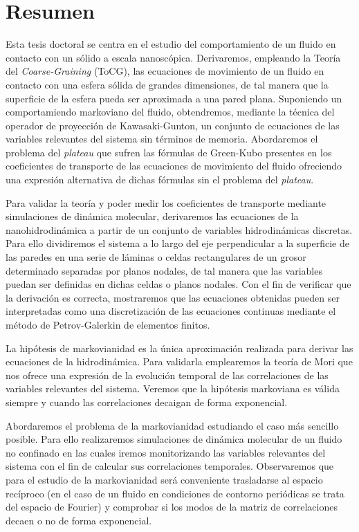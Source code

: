 \documentclass[b5paper,openright,10pt]{book}
\begin{document}
\chapter*{Resumen} %
Esta tesis doctoral se centra en el estudio del comportamiento de un fluido en contacto con un sólido a escala nanoscópica. 
Derivaremos, empleando la Teoría del \textit{Coarse-Graining} (ToCG), las ecuaciones de movimiento de un fluido en contacto con una esfera sólida de grandes dimensiones, de tal manera que la superficie de la esfera pueda ser aproximada a una pared plana. 
Suponiendo un comportamiendo markoviano del fluido, obtendremos, mediante la técnica del operador de proyección de Kawasaki-Gunton, un conjunto de ecuaciones de las variables relevantes del sistema sin términos de memoria. 
Abordaremos el problema del \textit{plateau} que sufren las fórmulas de Green-Kubo presentes en los coeficientes de transporte de las ecuaciones de movimiento del fluido ofreciendo una expresión alternativa de dichas fórmulas sin el problema del \textit{plateau}.  

Para validar la teoría y poder medir los coeficientes de transporte mediante simulaciones de dinámica molecular, derivaremos las ecuaciones de la nanohidrodinámica a partir de un conjunto de variables hidrodinámicas discretas. 
Para ello dividiremos el sistema a lo largo del eje perpendicular a la superficie de las paredes en una serie de láminas o celdas rectangulares de un grosor determinado separadas por planos nodales, de tal manera que las variables puedan ser definidas en dichas celdas o planos nodales.  
Con el fin de verificar que la derivación es correcta, mostraremos que las ecuaciones obtenidas pueden ser interpretadas como una discretización de las ecuaciones continuas mediante el método de Petrov-Galerkin de elementos finitos.  

La hipótesis de markovianidad es la única aproximación realizada para derivar las ecuaciones de la hidrodinámica. Para validarla emplearemos la teoría de Mori que nos ofrece una expresión de la evolución temporal de las correlaciones de las variables relevantes del sistema. Veremos que la hipótesis markoviana es válida siempre y cuando las correlaciones decaigan de forma exponencial.

Abordaremos el problema de la markovianidad estudiando el caso más sencillo posible. Para ello realizaremos simulaciones de dinámica molecular de un fluido no confinado en las cuales iremos monitorizando las variables relevantes del sistema con el fin de calcular sus correlaciones temporales. 
Observaremos que para el estudio de la markovianidad será conveniente trasladarse al espacio recíproco (en el caso de un fluido en condiciones de contorno periódicas se trata del espacio de Fourier) y comprobar si los modos de la matriz de correlaciones decaen o no de forma exponencial. 
\end{document}

